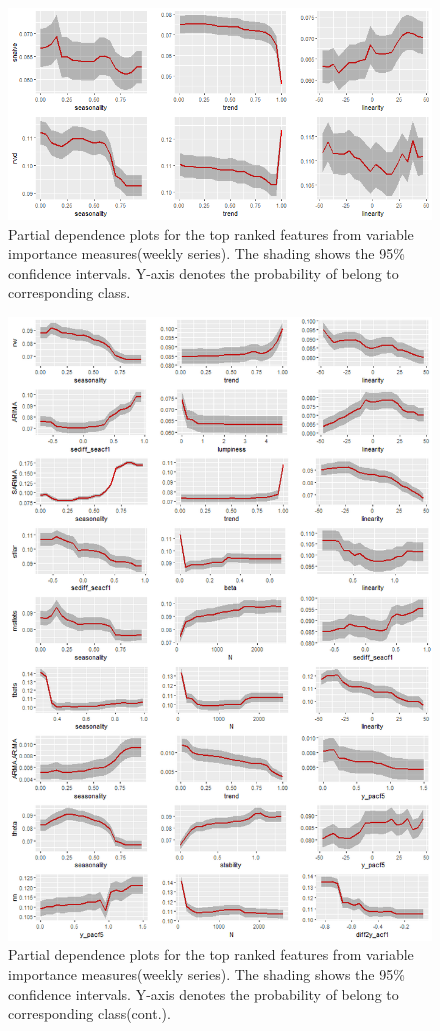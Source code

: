 \documentclass[11pt,a4paper,]{article}
\theoremstyle{definition}
\theoremstyle{definition}
\theoremstyle{definition}
\theoremstyle{remark}
\begin{document}
\begin{figure}
\centering
\includegraphics{figures/weeklypdp-1.png}
\caption{\label{fig:weeklypdp}Partial dependence plots for the top ranked
features from variable importance measures(weekly series). The shading
shows the 95\% confidence intervals. Y-axis denotes the probability of
belong to corresponding class.}
\end{figure}

\newpage

\begin{figure}
\centering
\includegraphics{figures/weeklypdp2-1.png}
\caption{\label{fig:weeklypdp2}Partial dependence plots for the top ranked
features from variable importance measures(weekly series). The shading
shows the 95\% confidence intervals. Y-axis denotes the probability of
belong to corresponding class(cont.).}
\end{figure}
\end{document}

